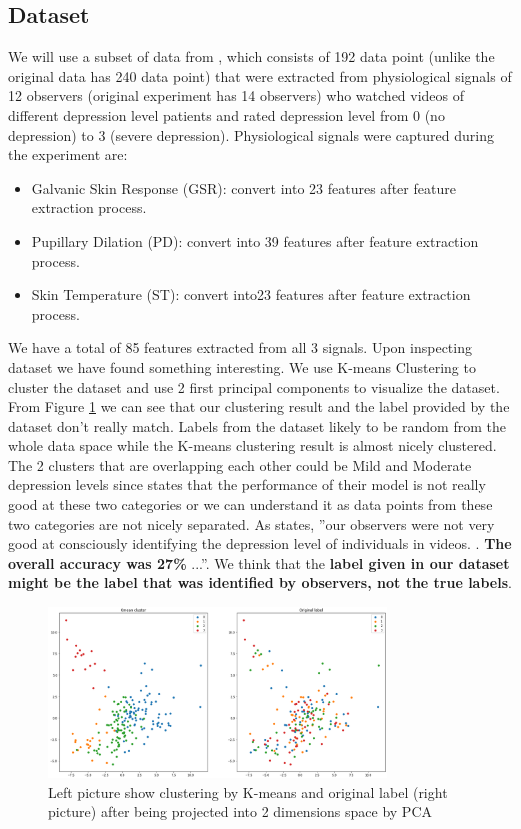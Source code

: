 \documentclass[runningheads]{llncs}
\begin{document}
\subsection{Dataset}
We will use a subset of data from \cite{data_paper}, which consists of 192 data point (unlike the original data has 240 data point) that were extracted from physiological signals of 12 observers (original experiment has 14 observers) who watched videos of different depression level patients and rated depression level from 0 (no depression) to 3 (severe depression). Physiological signals were captured during the experiment are:
\begin{itemize}
    \item Galvanic Skin Response (GSR): convert into 23 features after feature extraction process.
    \item Pupillary Dilation (PD): convert into 39 features after feature extraction process.
    \item Skin Temperature (ST): convert into23 features after feature extraction process.
\end{itemize}
We have a total of 85 features extracted from all 3 signals. Upon inspecting dataset we have found something interesting. We use K-means Clustering to cluster the dataset and use 2 first principal components to visualize the dataset. From Figure \ref{fig:kmean} we can see that our clustering result and the label provided by the dataset don’t really match. Labels from the dataset likely to be random from the whole data space while the K-means clustering result is almost nicely clustered. The 2 clusters that are overlapping each other could be Mild and Moderate depression levels since \cite{data_paper} states that the performance of their model is not really good at these two categories or we can understand it as data points from these two categories are not nicely separated. As \cite{data_paper} states, ”our observers were not very good at consciously identifying the depression level of individuals in videos. . \textbf{The overall accuracy was 27\%} ...”. We think that the \textbf{label given in our dataset might be the label that was identified by observers, not the true labels}.
\begin{figure}
    \centering
    \includegraphics[width=0.8\textwidth]{kmean_vs_original.PNG}
    \caption{Left picture show clustering by K-means and original label (right picture) after being projected into 2 dimensions space by PCA}
    \label{fig:kmean}
\end{figure}
\end{document}
